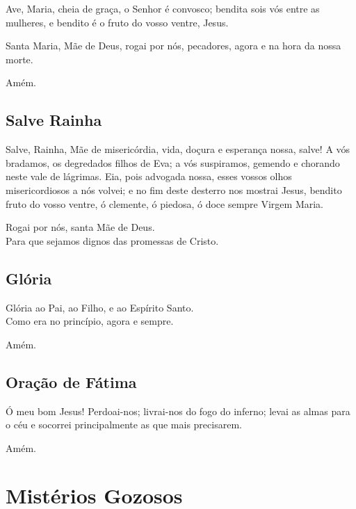 \documentclass[10pt,a5paper]{book}
\begin{document}
Ave, Maria, cheia de graça, o Senhor é convosco;
bendita sois vós entre as mulheres, e bendito é o fruto do vosso ventre, Jesus.

Santa Maria, Mãe de Deus, rogai por nós, pecadores, agora e na hora da nossa morte.

Amém.


\section{Salve Rainha}

Salve, Rainha,
Mãe de misericórdia,
vida, doçura e esperança nossa, salve!
A vós bradamos, os degredados filhos de Eva;
a vós suspiramos, gemendo e chorando neste vale de lágrimas.
Eia, pois advogada nossa, esses vossos olhos misericordiosos a nós volvei;
e no fim deste desterro nos mostrai Jesus, bendito fruto do vosso ventre,
ó clemente, ó piedosa, ó doce sempre Virgem Maria.

Rogai por nós, santa Mãe de Deus. \\
Para que sejamos dignos das promessas de Cristo.


\section{Glória}

Glória ao Pai, ao Filho, e ao Espírito Santo. \\
Como era no princípio, agora e sempre.

Amém.


\section{Oração de Fátima}

Ó meu bom Jesus!
Perdoai-nos;
livrai-nos do fogo do inferno;
levai as almas para o céu e socorrei principalmente as que mais precisarem.

Amém.


\chapter{Mistérios Gozosos}
\end{document}
